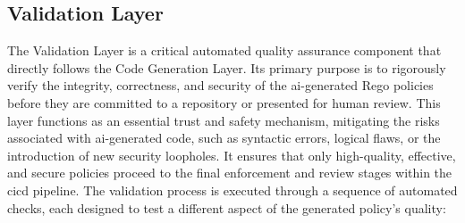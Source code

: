 
\subsection{Validation Layer} %
\label{sec:Validation Layer}

The Validation Layer is a critical automated quality assurance component that directly follows the Code Generation Layer. Its primary purpose is to rigorously verify the integrity, correctness, and security of the \gls{ai}-generated Rego policies before they are committed to a repository or presented for human review. This layer functions as an essential trust and safety mechanism, mitigating the risks associated with \gls{ai}-generated code, such as syntactic errors, logical flaws, or the introduction of new security loopholes. It ensures that only high-quality, effective, and secure policies proceed to the final enforcement and review stages within the \gls{cicd} pipeline.
The validation process is executed through a sequence of automated checks, each designed to test a different aspect of the generated policy's quality:

